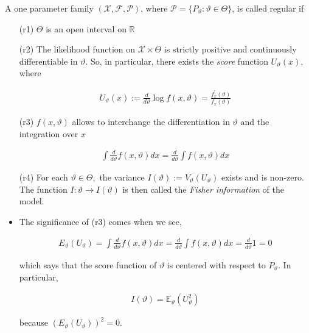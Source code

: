 \documentclass[ 11pt,%
				a4paper,%
				twoside,%
				headinclude,%
				footinclude = true,%
				cleardoublepage = empty,%
				reqno]{scrbook}
\begin{document}
\begin{definition} A one parameter family $\left(\mathcal{X}, \mathscr{F}, \mathcal{P} \right)$, where $\mathcal{P} = \{ P_{\vartheta}: \vartheta \in \Theta \}$, is called regular if

\begin{itemize}
  \item[(r1)] $\Theta$ is an open interval on $\mathbb{R}$

  \item[(r2)] The likelihood function on $\mathcal{X} \times \Theta$ is strictly positive and continuously differentiable in $\vartheta .$ So, in particular, there exists the \emph{score} function $U_{\vartheta}(x)$, where

  \begin{align*}
    U_{\vartheta}(x):=\frac{d}{d \vartheta} \log f(x, \vartheta)=\frac{f_{x}^{\prime}(\vartheta)}{f_{x}(\vartheta)}
  \end{align*}

  \item[(r3)] $f(x, \vartheta)$ allows to interchange the differentiation in $\vartheta$ and the integration over $x$

  \begin{align*}
    \int \frac{d}{d \vartheta} f(x, \vartheta) d x=\frac{d}{d \vartheta} \int f(x, \vartheta) d x
  \end{align*}


  \item[(r4)] For each $\vartheta \in \Theta,$ the variance $I(\vartheta):=V_{\vartheta}\left(U_{\vartheta}\right)$ exists and is non-zero. The function $I: \vartheta \rightarrow I(\vartheta)$ is then called the \emph{Fisher information} of the model.

\end{itemize}
\end{definition}




\begin{remarks}

\begin{itemize}
  \item[]
  \item The significance of (r3) comes when we see,

\begin{align*}
  E_{\vartheta}\left(U_{\vartheta}\right)=\int \frac{d}{d \vartheta} f(x, \vartheta) d x=\frac{d}{d \vartheta} \int f(x, \vartheta) d x=\frac{d}{d \vartheta} 1=0
\end{align*}

which says that the score function of $\vartheta$ is centered with respect to $P_{\vartheta} $. In particular,

\begin{align*}
  I(\vartheta)=\mathbb{E}_{\vartheta}\left(U_{\vartheta}^{2}\right)
\end{align*}

because $\left(E_{\vartheta}\left(U_{\vartheta}\right)\right)^2 = 0$.

\end{itemize}
  
\end{remarks}
\end{document}
